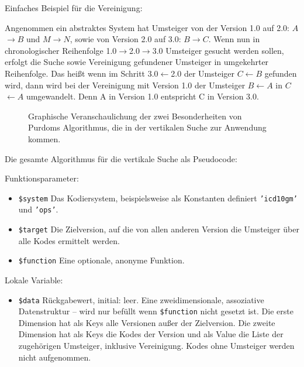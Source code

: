 Einfaches Beispiel für die Vereinigung: 

Angenommen ein abstraktes System hat Umsteiger von der Version 1.0 auf 2.0: $A$$\rightarrow$$B$ und $M$$\rightarrow$$N$, sowie von Version 2.0 auf 3.0: $B$$\rightarrow$$C$. Wenn nun in chronologischer Reihenfolge 1.0$\rightarrow$2.0$\rightarrow$3.0 Umsteiger gesucht werden sollen, erfolgt die Suche sowie Vereinigung gefundener Umsteiger in umgekehrter Reihenfolge. Das heißt wenn im Schritt 3.0$\leftarrow$2.0 der Umsteiger $C$$\leftarrow$$B$ gefunden wird, dann wird bei der Vereinigung mit Version 1.0 der Umsteiger $B$$\leftarrow$$A$ in $C$$\leftarrow$$A$ umgewandelt. Denn A in Version 1.0 entspricht C in Version 3.0. 

\begin{figure}[H]
    \centering\Huge%
    \resizebox{.85\linewidth}{!}{}
    \normalsize\caption{Graphische Veranschaulichung der zwei Besonderheiten von Purdoms Algorithmus, die in der vertikalen Suche zur Anwendung kommen.}
\end{figure}

Die gesamte Algorithmus für die vertikale Suche als Pseudocode:


Funktionsparameter:

\begin{itemize}
\item \texttt{\$system} \newline Das Kodiersystem, beispielsweise als Konstanten definiert \texttt{'icd10gm'} und \texttt{'ops'}. 
\item \texttt{\$target} \newline Die Zielversion, auf die von allen anderen Version die Umsteiger über alle Kodes ermittelt werden.
\item \texttt{\$function} \newline Eine optionale, anonyme Funktion.
\end{itemize}

Lokale Variable:

\begin{itemize}
\item \texttt{\$data} \hspace{2em} Rückgabewert, initial: leer.
\newline Eine zweidimensionale, assoziative Datenstruktur -- wird nur befüllt wenn \texttt{\$function} nicht gesetzt ist. Die erste Dimension hat als Keys alle Versionen außer der Zielversion. Die zweite Dimension hat als Keys die Kodes der Version und als Value die Liste der zugehörigen Umsteiger, inklusive Vereinigung. Kodes ohne Umsteiger werden nicht aufgenommen.
\end{itemize}

